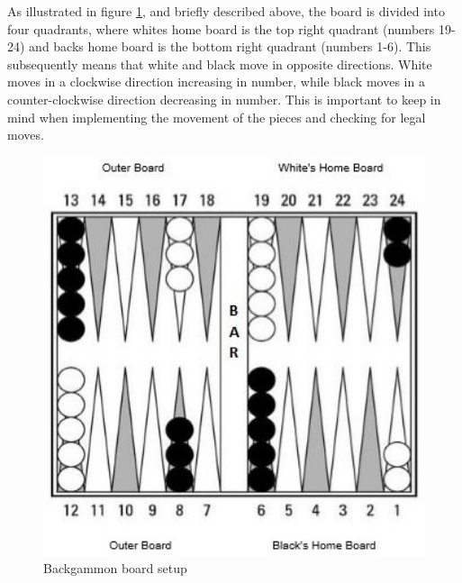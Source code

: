 \documentclass[ twoside,openright,titlepage,numbers=noenddot,headinclude,%
                footinclude=true,cleardoublepage=empty,abstractoff, %
                BCOR=5mm,paper=a4,fontsize=11pt,%
                ngerman,american,%
                ]{scrreprt}
\begin{document}
As illustrated in figure \ref{fig:backgammon_board_setup}, and briefly described above, the board is divided into four quadrants, where whites home board is the top right quadrant (numbers 19-24) and backs home board is the bottom right quadrant (numbers 1-6). This subsequently means that white and black move in opposite directions. White moves in a clockwise direction increasing in number, while black moves in a counter-clockwise direction decreasing in number. This is important to keep in mind when implementing the movement of the pieces and checking for legal moves.



\begin{figure}[H]
    \centering
    \includegraphics[width=1\textwidth]{gfx/Backgammon-setup.jpg}
    \caption{Backgammon board setup}
    \label{fig:backgammon_board_setup}
\end{figure}
\end{document}
